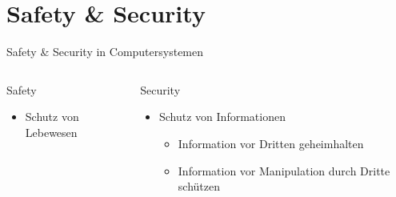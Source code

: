 \section{Safety \& Security}

\begin{frame}[T]{Safety \& Security in Computersystemen}
\small
  \begin{columns}[t,fullwidth]
   \hfill
    \begin{column}{.45\linewidth}
      \begin{block}{Safety}
      \begin{itemize}
        \item Schutz von Lebewesen
      \end{itemize}
      \end{block}
    \end{column}
    \hfill
    \begin{column}{.45\linewidth}
      \begin{block}{Security}
      \begin{itemize}
        \item Schutz von Informationen
        \begin{itemize}
          \item Information vor Dritten geheimhalten
          \item Information vor Manipulation durch Dritte schützen
        \end{itemize}
      \end{itemize}
      \end{block}
    \end{column}
    \hfill
  \end{columns}
\end{frame}

